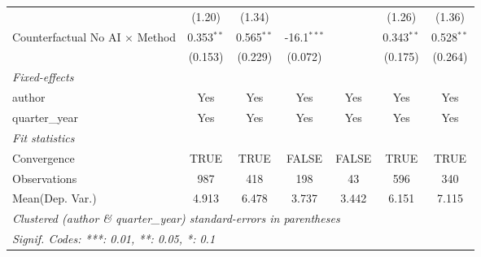 \begin{tabular}{lcccccc}
                                         & (1.20)        & (1.34)        &                  &               & (1.26)        & (1.36)\\   
   Counterfactual No AI $\times$ Method  & 0.353$^{**}$  & 0.565$^{**}$  & -16.1$^{***}$    &               & 0.343$^{**}$  & 0.528$^{**}$\\   
                                         & (0.153)       & (0.229)       & (0.072)          &               & (0.175)       & (0.264)\\   
   \midrule
   \emph{Fixed-effects}\\
   author                                & Yes           & Yes           & Yes              & Yes           & Yes           & Yes\\  
   quarter\_year                         & Yes           & Yes           & Yes              & Yes           & Yes           & Yes\\  
   \midrule
   \emph{Fit statistics}\\
   Convergence                           &TRUE           & TRUE          & FALSE            & FALSE         & TRUE          & TRUE\\  
   Observations                          & 987           & 418           & 198              & 43            & 596           & 340\\  
Mean(Dep. Var.) & 4.913 & 6.478 & 3.737 & 3.442 & 6.151 & 7.115 \\
   \midrule \midrule
   \multicolumn{7}{l}{\emph{Clustered (author \& quarter\_year) standard-errors in parentheses}}\\
   \multicolumn{7}{l}{\emph{Signif. Codes: ***: 0.01, **: 0.05, *: 0.1}}\\
\end{tabular}
\par\endgroup
